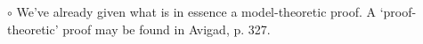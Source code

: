 \documentclass{article}
\newcommand{\N}{\mathbb{N}}
\newcommand{\RQ}{\mathbf{Q}}
\newcommand\Point[1]{\noindent \hspace{\labelsep} {
$\bullet$ #1} \smallskip}
\newcommand\point[1]{\noindent \hspace{\labelsep} {\small $\circ$ #1} \smallskip}
\newcommand\timestamp[1]{}
\begin{document}
\point{We've already given what is in essence a model-theoretic proof. A `proof-theoretic' proof may be found in Avigad, p. 327.}

\timestamp{80 min}

\begin{comment}

\section{$\RQ$ Computes, Kind of. Part 2: Functions}

\point{Now that we've seen that $\RQ$ can represent computable predicates, we will show a standard trick that turns this into $\RQ$ representing computable functions.}

\point{Let $f \colon \N^k \to \N$ be a total computable function. Then, the graph of $f$ is a computable relation $R$ on $\N^k \times \N$.}

\point{Note that $f$ is assumed to be total. If $f$ were assumed partial computable, this would be a problem.}

\point{You might think that now we simply consider the formula $\varphi(\vec x, y)$ that represents $R$ to be a formula that represents $f$, but that only gives you the following theorem, which is a little weaker than we can get away with:}

\point{Theorem: Let $f \colon \N^k \to \N$ be total computable. Then, there is a $\Sigma_1$ formula $\varphi(\vec x, y)$ such that, for all $\vec a \in \N^k$,
\begin{equation}
\begin{cases}
\RQ \vdash \varphi(\underline{\vec a}, \underline{f(a)}),\\
\RQ \vdash \neg\varphi(\underline{\vec a}, \underline b), \text{ for $b \neq f(a)$}.
\end{cases}
\end{equation}}

\point{Here is how we may try to strengthen this theorem: As it is, it leaves open the possibility that a nonstandard model of $\RQ$ might confuse $f(a)$ for a nonstandard element. That is, there may be some model $M$ and $m \in M$ such that $M \vDash \varphi(\underline{\vec a}, m)$ even though $m \neq f(a)$.}

\point{We will forbid this from happening, by using a Rosser trick similar to what we've done when representing relations.}

\Point{Theorem: Let $f \colon \N^k \to \N$ be total computable. Then, there is a $\Sigma_1$ formula $\psi(\vec x, y)$ such that, for all $\vec a \in \N^k$,
\begin{equation}\label{eq:2}
\RQ \vdash \forall_y (\psi(\underline{\vec a}, y) \leftrightarrow y = \underline{f(\vec a)}).
\end{equation}}


\end{comment}
\end{document}

